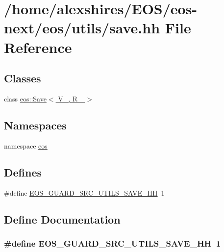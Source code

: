 \hypertarget{save_8hh}{
\section{/home/alexshires/EOS/eos-\/next/eos/utils/save.hh File Reference}
\label{save_8hh}
}
\subsection*{Classes}
\begin{DoxyCompactItemize}
\item 
class \hyperlink{classeos_1_1Save}{eos::Save$<$ V\_\-, R\_\- $>$}
\end{DoxyCompactItemize}
\subsection*{Namespaces}
\begin{DoxyCompactItemize}
\item 
namespace \hyperlink{namespaceeos}{eos}
\end{DoxyCompactItemize}
\subsection*{Defines}
\begin{DoxyCompactItemize}
\item 
\#define \hyperlink{save_8hh_aedf5ad734281b5cd4793a03d7c1c171e}{EOS\_\-GUARD\_\-SRC\_\-UTILS\_\-SAVE\_\-HH}~1
\end{DoxyCompactItemize}


\subsection{Define Documentation}
\hypertarget{save_8hh_aedf5ad734281b5cd4793a03d7c1c171e}{
\subsubsection[{EOS\_\-GUARD\_\-SRC\_\-UTILS\_\-SAVE\_\-HH}]{\setlength{\rightskip}{0pt plus 5cm}\#define EOS\_\-GUARD\_\-SRC\_\-UTILS\_\-SAVE\_\-HH~1}}
\label{save_8hh_aedf5ad734281b5cd4793a03d7c1c171e}
